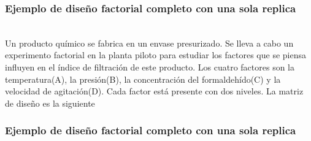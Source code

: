 \documentclass[12pt]{beamer}
\begin{document}
\begin{frame}
\frametitle{Ejemplo de diseño factorial completo con una sola replica}
~\\Un producto químico se fabrica en un envase presurizado. Se lleva a cabo un experimento factorial en la planta piloto para estudiar los factores que se piensa influyen en el índice de filtración de este producto. Los cuatro factores son la temperatura(A), la presión(B), la concentración del formaldehído(C) y la velocidad de agitación(D). Cada factor está presente con dos niveles. La matriz de diseño es la siguiente
\end{frame}
\begin{frame}
\frametitle{Ejemplo de diseño factorial completo con una sola replica}
\begin{table}[htbp]
  \centering
  \caption{Matriz de diseño ejemplo con una sola réplica}
  \label{tab:addlabel}%
\end{table}%
\end{frame}
\end{document}
